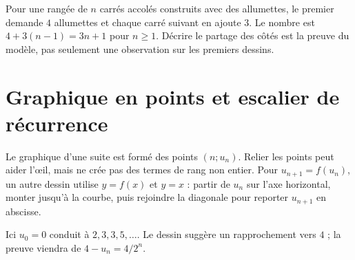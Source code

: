 \documentclass[../cours_1re.tex]{subfiles}
\begin{document}
Pour une rangée de $n$ carrés accolés construits avec des allumettes, le premier demande $4$ allumettes et chaque carré suivant en ajoute $3$. Le nombre est $4+3(n-1)=3n+1$ pour $n\ge1$. Décrire le partage des côtés est la preuve du modèle, pas seulement une observation sur les premiers dessins.
\section{Graphique en points et escalier de récurrence}
Le graphique d'une suite est formé des points $(n;u_n)$. Relier les points peut aider l'œil, mais ne crée pas des termes de rang non entier.
Pour $u_{n+1}=f(u_n)$, un autre dessin utilise $y=f(x)$ et $y=x$ : partir de $u_n$ sur l'axe horizontal, monter jusqu'à la courbe, puis rejoindre la diagonale pour reporter $u_{n+1}$ en abscisse.
\begin{center}
\end{center}
Ici $u_0=0$ conduit à $2,3,3{,}5,\ldots$. Le dessin suggère un rapprochement vers $4$ ; la preuve viendra de $4-u_n=4/2^n$.
\end{document}
